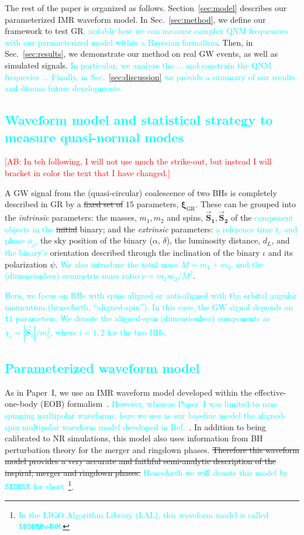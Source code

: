 \documentclass[twocolumn,prd,aps,superscriptaddress,preprintnumbers,tightenlines,showpacs,nofootinbib,eqsecnum,amsfonts,amsmath]{revtex4-1}
\newcommand{\paperone}{Paper~I\xspace}
\newcommand{\ab}[1]{\textcolor{cyan}{#1}}
\newcommand{\comment}[1]{\textcolor{red}{[#1]}}
\newcommand{\bxigr}{\bm{\xi}_{\text{GR}}}
\newcommand{\bs}[1]{\bm{\vec{S}_{#1}}}
\newcommand{\SEOB}{\texttt{SEOBNR}}
\begin{document}
The rest of the paper is organized as follows. Section~\ref{sec:model} describes our parameterized IMR
waveform model. In Sec.~\ref{sec:method}, we define our framework to test GR\ab{, notably how we can measure 
complex QNM frequencies with our parameterized model within a Bayesian formalism}. Then, in Sec.~\ref{sec:results}, 
we demonstrate our method on real GW events, as well as simulated signals. \ab{In particular, we analyze 
the ... and constrain the QNM frequecies ... Finally, in Sec.~\ref{sec:discussion} we provide a summary of
our results and discuss future developments.} 

\ab{\section{Waveform model and statistical strategy to measure quasi-normal modes}}

\comment{AB: In teh following, I will not use much the strike-out, but instead I will 
bracket in color the text that I have changed.}

A GW signal from the (quasi-circular) coalescence of two BHs is
completely described in GR by a \sout{fixed set of} $15$ parameters,
$\bxigr$. These can be grouped into the \emph{intrinsic} parameters:
the masses, $m_1, m_2$ and spins, $\bs1, \bs2$ of the \ab{component 
objects in the} \sout{initial} binary; and the 
\emph{extrinsic} parameters: \ab{a reference time $t_c$ and phase 
$\phi_c$,} the sky position of the binary ($\alpha$,
$\delta$), the luminosity distance, $d_L$, and \ab{the binary's} orientation
described through the inclination of the binary $\iota$ and its
polarization $\psi$. \ab{We also introduce the total mass $M = m_1+m_2$, 
and the (dimensionless) symmetric mass ratio $\nu = m_1m_2/M^2$}. 

\ab{Here, we focus on BHs with spins aligned or anti-aligned 
with the orbital angular momentum (henceforth, ``aligned-spin''). In this case,  
the GW signal depends on $11$ parameters. We denote the 
aligned-spin \ab{(dimensionless)} components as $\chi_{i} = |\vec{\bm{S}}_i|/m^2_i$, where $i=1,2$ for the two BHs.}

\ab{\subsection{Parameterized waveform model}}\label{sec:model}

As in \paperone, we use an IMR waveform model developed within the effective-one-body (EOB) 
formalism~\cite{}. \ab{However, whereas \paperone was limited to non-spinning multipolar waveforms, 
here we use as our baseline model the aligned-spin multipolar waveform model 
developed in Ref.~\citep{Cotesta:2018fcv}}. In addition to being
calibrated to NR simulations, this model also uses information from BH
perturbation theory for the merger and ringdown phases. \sout{Therefore this
waveform model provides a very accurate and faithful semi-analytic
description of the inspiral, merger and ringdown phases.} \ab{Henceforth we
will denote this model by $\SEOB$ for short}~\footnote{\ab{In the LIGO Algorithm Library (LAL), this 
waveform model is called {\tt SEOBNRv4HM}.}}.
\end{document}
